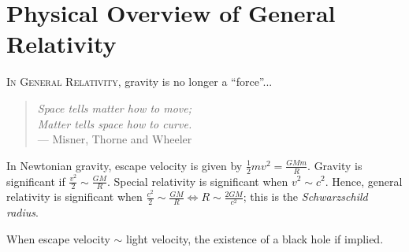 { %
\renewcommand{\thechapter}{\arabic{chapter}} %
\chapter{Physical Overview of General Relativity}
}

\textsc{In General Relativity}, gravity is no longer a ``force''...

\begin{quote}
	\emph{Space tells matter how to move; \\
	\hspace*{1em} Matter tells space how to curve.} \\
	\hspace*{2em} --- Misner, Thorne and Wheeler
\end{quote}

\begin{center}
\end{center}

\noindent
In Newtonian gravity, escape velocity is given by $\frac12mv^2 = \frac{GMm}{R}$.
Gravity is significant if $\frac{v^2}{2} \sim \frac{GM}{R}$.
Special relativity is significant when $v^2 \sim c^2$.
Hence, general relativity is significant when $\frac{c^2}{2} \sim \frac{GM}{R} \iff R \sim \frac{2GM}{c^2}$; this is the \emph{Schwarzschild radius}.

When escape velocity $\sim$ light velocity, the existence of a {black hole} if implied.